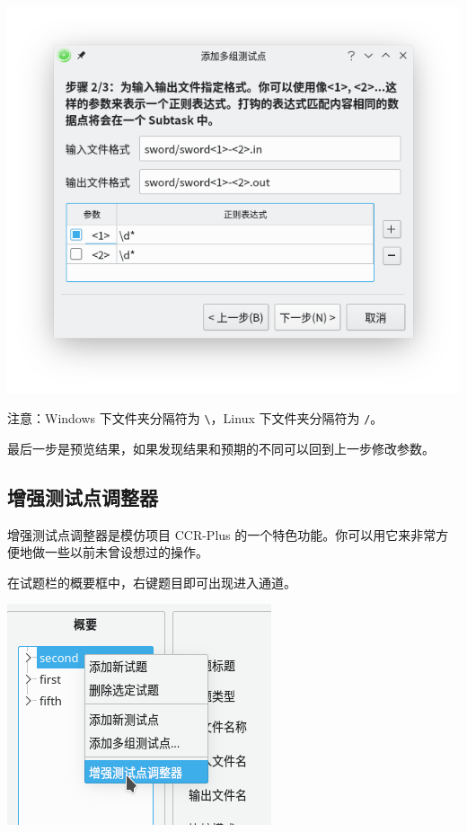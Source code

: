 \documentclass[UTF-8]{ctexart}
\begin{document}
			\begin{center}
			\includegraphics[scale=0.7]{pics/addtestcases.png}
			\end{center}

			注意：Windows 下文件夹分隔符为 \texttt{\textbackslash}，Linux 下文件夹分隔符为 \texttt{/}。

			最后一步是预览结果，如果发现结果和预期的不同可以回到上一步修改参数。

		\subsection{增强测试点调整器}

			增强测试点调整器是模仿项目 CCR-Plus 的一个特色功能。你可以用它来非常方便地做一些以前未曾设想过的操作。

			在试题栏的概要框中，右键题目即可出现进入通道。

			\begin{center}
			\includegraphics[scale=0.7]{pics/intoexttestcasemodifier.png}
			\end{center}
\end{document}
